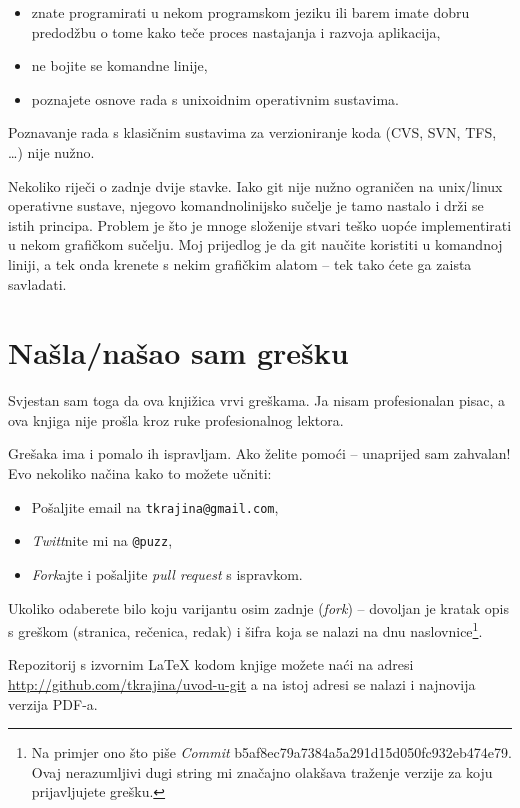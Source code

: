 \begin{itemize}
	\item znate programirati u nekom programskom jeziku ili barem imate dobru predodžbu o tome kako teče proces nastajanja i razvoja aplikacija,
	\item ne bojite se komandne linije,
	\item poznajete osnove rada s unixoidnim operativnim sustavima.
\end{itemize}

Poznavanje rada s klasičnim sustavima za verzioniranje koda (CVS, SVN, TFS, \dots) nije nužno.

Nekoliko riječi o zadnje dvije stavke.
Iako git nije nužno ograničen na unix/linux operativne sustave, njegovo komandnolinijsko sučelje je tamo nastalo i drži se istih principa.
Problem je što je mnoge složenije stvari teško uopće implementirati u nekom grafičkom sučelju. 
Moj prijedlog je da git naučite koristiti u komandnoj liniji, a tek onda krenete s nekim grafičkim alatom -- tek tako ćete ga zaista savladati.

\section*{Našla/našao sam grešku}

Svjestan sam toga da ova knjižica vrvi greškama.
Ja nisam profesionalan pisac, a ova knjiga nije prošla kroz ruke profesionalnog lektora.

Grešaka ima i pomalo ih ispravljam.
Ako želite pomoći -- unaprijed sam zahvalan!
Evo nekoliko načina kako to možete učniti:

\begin{itemize}
    \item Pošaljite email na \verb+tkrajina@gmail.com+,
    \item \emph{Twitt}nite mi na \verb+@puzz+,
    \item \emph{Fork}ajte i pošaljite \emph{pull request} s ispravkom. 
\end{itemize}

Ukoliko odaberete bilo koju varijantu osim zadnje (\emph{fork}) -- dovoljan je kratak opis s greškom (stranica, rečenica, redak) i šifra koja se nalazi na dnu naslovnice\footnote{Na primjer ono što piše \emph{Commit} b5af8ec79a7384a5a291d15d050fc932eb474e79. Ovaj nerazumljivi dugi string mi značajno olakšava traženje verzije za koju prijavljujete grešku.}.

Repozitorij s izvornim \LaTeX{} kodom knjige možete naći na adresi \\\url{http://github.com/tkrajina/uvod-u-git}
 a na istoj adresi se nalazi i najnovija verzija PDF-a.

